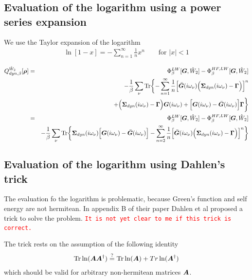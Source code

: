 \documentclass[11pt,a4paper]{report}
\newcommand{\petertt}[1]{\textcolor{red}{\texttt{#1}}}
\begin{document}
\subsection{Evaluation of the logarithm using a power series expansion}
We use the Taylor expansion of the logarithm
\begin{eqnarray}
\ln[1-x]=-\sum_{n=1}^\infty \frac{1}{n}x^n \qquad\text{for $|x|<1$}
\end{eqnarray}


\begin{eqnarray}
Q^{\hat{W}_2}_{dyn,\beta}[\bm{\rho}]
&=&
\Phi^{LW}_\beta[\bm{G},\hat{W}_2]-\Phi^{HF,LW}_\beta[\bm{G},\hat{W}_2]
\nonumber\\
&&-\frac{1}{\beta}\sum_\nu\mathrm{Tr}\biggl\lbrace
-\sum_{n=1}^\infty\frac{1}{n}
\Bigl[\bar{\bm{G}}(i\omega_\nu)
\Bigl(\bm{\Sigma}_{dyn}(i\omega_\nu)-\bm{\Gamma}\Bigr)
\Bigr]^n
\nonumber\\&&
+\Bigl(\bm{\Sigma}_{dyn}(i\omega_\nu)-\bm{\Gamma}\Bigr)\bm{G}(i\omega_\nu)
+
\Bigl[\bm{G}(i\omega_\nu)-\bar{\bm{G}}(i\omega_\nu)\Bigr]
\bm{\Gamma}
\biggr\rbrace
\nonumber\\
&=&
\Phi^{LW}_\beta[\bm{G},\hat{W}_2]-\Phi^{HF,LW}_\beta[\bm{G},\hat{W}_2]
\nonumber\\
&&-\frac{1}{\beta}\sum_\nu\mathrm{Tr}\biggl\lbrace
\bm{\Sigma}_{dyn}(i\omega_\nu)
\Bigl[\bm{G}(i\omega_\nu)-\bar{\bm{G}}(i\omega_\nu)\Bigr]
-\sum_{n=2}^\infty\frac{1}{n}
\Bigl[\bar{\bm{G}}(i\omega_\nu)
\Bigl(\bm{\Sigma}_{dyn}(i\omega_\nu)-\bm{\Gamma}\Bigr)
\Bigr]^n
\biggr\rbrace
\nonumber\\
\label{eq:dmf1greenenergypower}
\end{eqnarray}

\subsection{Evaluation of the logarithm using Dahlen's trick}
The evaluation fo the logarithm is problematic, because Green's
function and self energy are not hermitean. In appendix B of their
paper\cite{dahlen06_pra73_12511} Dahlen et al proposed a trick to
solve the problem. \petertt{It is not yet clear to me if this trick is
  correct.}

The trick rests on the assumption of the following identity
\begin{eqnarray}
\mathrm{Tr}\ln(\bm{A}\bm{A}^\dagger)\stackrel{?}{=}
\mathrm{Tr}\ln(\bm{A})+Tr\ln(\bm{A}^\dagger)
\end{eqnarray}
which should be valid for arbitrary non-hermitean matrices $\bm{A}$.
\end{document}
